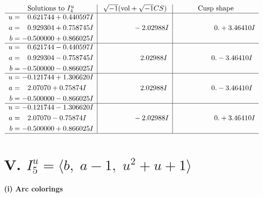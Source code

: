 \documentclass[1p]{elsarticle_modified}
\theoremstyle{definition}
\newcommand{\I}{\sqrt{-1}}
\begin{document}
$$\begin{array}{c|c|c}  
\text{Solutions to }I^u_{4}& \I (\text{vol} + \sqrt{-1}CS) & \text{Cusp shape}\\
 \hline 
\begin{aligned}
u &= \phantom{-}0.621744 + 0.440597 I \\
a &= \phantom{-}0.929304 + 0.758745 I \\
b &= -0.500000 + 0.866025 I\end{aligned}
 & \phantom{-0.000000 } -2.02988 I & \phantom{-0.000000 -}0. + 3.46410 I \\ \hline\begin{aligned}
u &= \phantom{-}0.621744 - 0.440597 I \\
a &= \phantom{-}0.929304 - 0.758745 I \\
b &= -0.500000 - 0.866025 I\end{aligned}
 & \phantom{-0.000000 -}2.02988 I & \phantom{-0.000000 } 0. - 3.46410 I \\ \hline\begin{aligned}
u &= -0.121744 + 1.306620 I \\
a &= \phantom{-}2.07070 + 0.75874 I \\
b &= -0.500000 - 0.866025 I\end{aligned}
 & \phantom{-0.000000 -}2.02988 I & \phantom{-0.000000 } 0. - 3.46410 I \\ \hline\begin{aligned}
u &= -0.121744 - 1.306620 I \\
a &= \phantom{-}2.07070 - 0.75874 I \\
b &= -0.500000 + 0.866025 I\end{aligned}
 & \phantom{-0.000000 } -2.02988 I & \phantom{-0.000000 -}0. + 3.46410 I\\
 \hline 
 \end{array}$$\newpage\newpage\renewcommand{\arraystretch}{1}
\centering \section*{V. $I^u_{5}= \langle b,\;a-1,\;u^2+u+1 \rangle$}
\flushleft \textbf{(i) Arc colorings}\\
\end{document}
